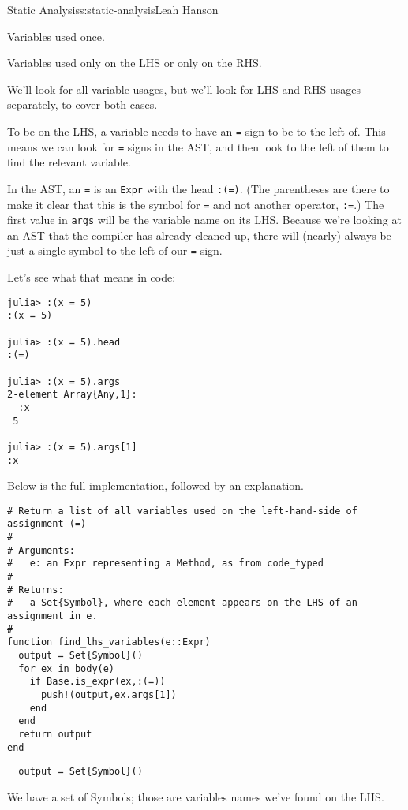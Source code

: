 \begin{aosachapter}{Static Analysis}{s:static-analysis}{Leah Hanson}
\begin{aosaenumerate}
\item
  Variables used once.
\item
  Variables used only on the LHS or only on the RHS.
\end{aosaenumerate}

We'll look for all variable usages, but we'll look for LHS and RHS
usages separately, to cover both cases.

\label{finding-lhs-usages}

To be on the LHS, a variable needs to have an \texttt{=} sign to be to
the left of. This means we can look for \texttt{=} signs in the AST, and
then look to the left of them to find the relevant variable.

In the AST, an \texttt{=} is an \texttt{Expr} with the head
\texttt{:(=)}. (The parentheses are there to make it clear that this is
the symbol for \texttt{=} and not another operator, \texttt{:=}.) The
first value in \texttt{args} will be the variable name on its LHS.
Because we're looking at an AST that the compiler has already cleaned
up, there will (nearly) always be just a single symbol to the left of
our \texttt{=} sign.

Let's see what that means in code:

\begin{verbatim}
julia> :(x = 5)
:(x = 5)

julia> :(x = 5).head
:(=)

julia> :(x = 5).args
2-element Array{Any,1}:
  :x
 5  

julia> :(x = 5).args[1]
:x
\end{verbatim}

Below is the full implementation, followed by an explanation.

\begin{verbatim}
# Return a list of all variables used on the left-hand-side of assignment (=)
#
# Arguments:
#   e: an Expr representing a Method, as from code_typed
#
# Returns:
#   a Set{Symbol}, where each element appears on the LHS of an assignment in e.
#
function find_lhs_variables(e::Expr)
  output = Set{Symbol}()
  for ex in body(e)
    if Base.is_expr(ex,:(=))
      push!(output,ex.args[1])
    end
  end
  return output
end
\end{verbatim}

\begin{verbatim}
  output = Set{Symbol}()
\end{verbatim}

We have a set of Symbols; those are variables names we've found on the
LHS.


\end{aosachapter}
